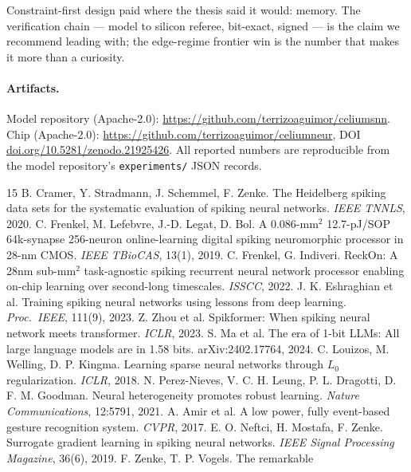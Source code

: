 \documentclass[11pt]{article}
\begin{document}
Constraint-first design paid where the thesis said it would: memory. The
verification chain --- model to silicon referee, bit-exact, signed --- is the
claim we recommend leading with; the edge-regime frontier win is the number
that makes it more than a curiosity.

\paragraph{Artifacts.} Model repository (Apache-2.0):
\url{https://github.com/terrizoaguimor/celiumsnn}. Chip (Apache-2.0):
\url{https://github.com/terrizoaguimor/celiumneur},
DOI \url{doi.org/10.5281/zenodo.21925426}. All reported numbers are reproducible
from the model repository's \texttt{experiments/} JSON records.

\begin{thebibliography}{15}
 B. Cramer, Y. Stradmann, J. Schemmel,
F. Zenke. The Heidelberg spiking data sets for the systematic evaluation of
spiking neural networks. \emph{IEEE TNNLS}, 2020.
 C. Frenkel, M. Lefebvre, J.-D. Legat, D. Bol.
A 0.086-mm$^2$ 12.7-pJ/SOP 64k-synapse 256-neuron online-learning digital
spiking neuromorphic processor in 28-nm CMOS. \emph{IEEE TBioCAS}, 13(1), 2019.
 C. Frenkel, G. Indiveri. ReckOn: A 28nm
sub-mm$^2$ task-agnostic spiking recurrent neural network processor enabling
on-chip learning over second-long timescales. \emph{ISSCC}, 2022.
 J. K. Eshraghian et al. Training spiking
neural networks using lessons from deep learning. \emph{Proc.\ IEEE},
111(9), 2023.
 Z. Zhou et al. Spikformer: When spiking neural
network meets transformer. \emph{ICLR}, 2023.
 S. Ma et al. The era of 1-bit LLMs: All large
language models are in 1.58 bits. arXiv:2402.17764, 2024.
 C. Louizos, M. Welling, D. P. Kingma.
Learning sparse neural networks through $L_0$ regularization. \emph{ICLR},
2018.
 N. Perez-Nieves, V. C. H. Leung, P. L. Dragotti,
D. F. M. Goodman. Neural heterogeneity promotes robust learning.
\emph{Nature Communications}, 12:5791, 2021.
 A. Amir et al. A low power, fully event-based gesture
recognition system. \emph{CVPR}, 2017.
 E. O. Neftci, H. Mostafa, F. Zenke. Surrogate
gradient learning in spiking neural networks. \emph{IEEE Signal Processing
Magazine}, 36(6), 2019.
 F. Zenke, T. P. Vogels. The remarkable

\end{thebibliography}
\end{document}
